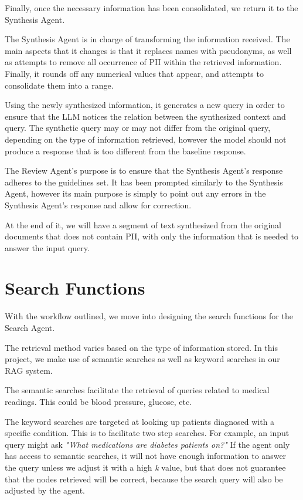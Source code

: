 Finally, once the necessary information has been consolidated, we return it to the Synthesis Agent.

The Synthesis Agent is in charge of transforming the information received. The main aspects that it changes is that it replaces names with pseudonyms, as well as attempts to remove all occurrence of PII within the retrieved information. Finally, it rounds off any numerical values that appear, and attempts to consolidate them into a range.

Using the newly synthesized information, it generates a new query in order to ensure that the LLM notices the relation between the synthesized context and query. The synthetic query may or may not differ from the original query, depending on the type of information retrieved, however the model should not produce a response that is too different from the baseline response.

The Review Agent's purpose is to ensure that the Synthesis Agent's response adheres to the guidelines set. It has been prompted similarly to the Synthesis Agent, however its main purpose is simply to point out any errors in the Synthesis Agent's response and allow for correction.

At the end of it, we will have a segment of text synthesized from the original documents that does not contain PII, with only the information that is needed to answer the input query.
\section{Search Functions}

With the workflow outlined, we move into designing the search functions for the Search Agent.

The retrieval method varies based on the type of information stored. In this project, we make use of semantic searches as well as keyword searches in our RAG system.

The semantic searches facilitate the retrieval of queries related to medical readings. This could be blood pressure, glucose, etc.

The keyword searches are targeted at looking up patients diagnosed with a specific condition. This is to facilitate two step searches. For example, an input query might ask \textit{"What medications are diabetes patients on?"}
If the agent only has access to semantic searches, it will not have enough information to answer the query unless we adjust it with a high \textit{k} value, but that does not guarantee that the nodes retrieved will be correct, because the search query will also be adjusted by the agent.

